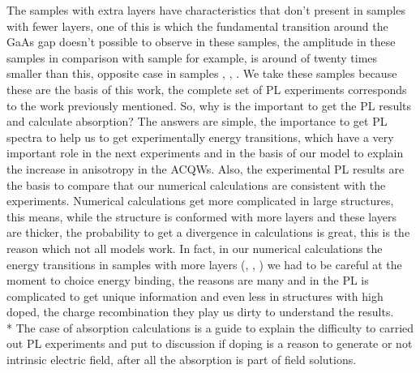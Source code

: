 The samples with extra layers have characteristics that don't present in samples with fewer layers, one of this is which the fundamental transition around the GaAs gap doesn't possible to observe in these samples, the amplitude in these samples in comparison with sample  for example, is around of twenty times smaller than this, opposite case in samples , , . We take these samples because these are the basis of this work, the complete set of PL experiments corresponds to the work previously mentioned. So, why is the important to get the PL results and calculate absorption?
The answers are simple, the importance to get PL spectra to help us to get experimentally energy transitions, which have a very important role in the next experiments and in the basis of our model to explain the increase in anisotropy in the ACQWs.  Also, the experimental PL results are the basis to compare that our numerical calculations are consistent with the experiments. Numerical calculations get more complicated in large structures, this means, while the structure is conformed with more layers and these layers are thicker, the probability to get a divergence in calculations is great, this is the reason which not all models work. In fact, in our numerical calculations the energy transitions in samples with more layers (, , ) we had to be careful at the moment to choice energy binding, the reasons are many and in the PL is complicated to get unique information and even less in structures with high doped, the charge recombination they play us dirty to understand the results. \\*
The case of absorption calculations is a guide to explain the difficulty to carried out PL experiments and put to discussion if doping is a reason to generate or not intrinsic electric field, after all the absorption is part of field solutions. \\

